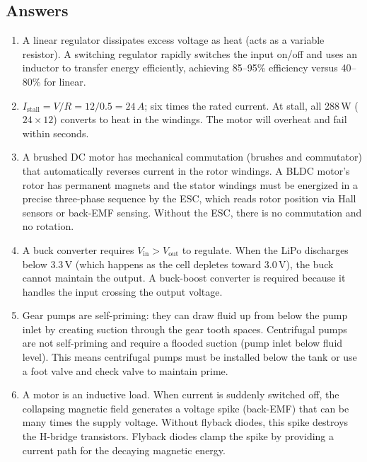 \documentclass[11pt,letterpaper,twoside,openany]{book}
\begin{document}
\subsection{Answers}

\begin{enumerate}[leftmargin=1.5em]
  \item A linear regulator dissipates excess voltage as heat (acts as a variable resistor). A switching regulator rapidly switches the input on/off and uses an inductor to transfer energy efficiently, achieving 85--95\% efficiency versus 40--80\% for linear.

  \item $I_{\text{stall}} = V/R = 12/0.5 = 24\,A$; six times the rated current. At stall, all 288\,W ($24 \times 12$) converts to heat in the windings. The motor will overheat and fail within seconds.

  \item A brushed DC motor has mechanical commutation (brushes and commutator) that automatically reverses current in the rotor windings. A BLDC motor's rotor has permanent magnets and the stator windings must be energized in a precise three-phase sequence by the ESC, which reads rotor position via Hall sensors or back-EMF sensing. Without the ESC, there is no commutation and no rotation.

  \item A buck converter requires $V_{\text{in}} > V_{\text{out}}$ to regulate. When the LiPo discharges below 3.3\,V (which happens as the cell depletes toward 3.0\,V), the buck cannot maintain the output. A buck-boost converter is required because it handles the input crossing the output voltage.

  \item Gear pumps are self-priming: they can draw fluid up from below the pump inlet by creating suction through the gear tooth spaces. Centrifugal pumps are not self-priming and require a flooded suction (pump inlet below fluid level). This means centrifugal pumps must be installed below the tank or use a foot valve and check valve to maintain prime.

  \item A motor is an inductive load. When current is suddenly switched off, the collapsing magnetic field generates a voltage spike (back-EMF) that can be many times the supply voltage. Without flyback diodes, this spike destroys the H-bridge transistors. Flyback diodes clamp the spike by providing a current path for the decaying magnetic energy.


\end{enumerate}
\end{document}
